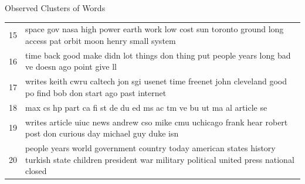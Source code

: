 \documentclass{article}
\begin{document}
\begin{question}
\begin{qsection}{Observed Clusters of Words}
\begin{tabular}[h!]{| c | L |}
			15	& 	space gov nasa high power earth work low cost sun toronto ground long access pat orbit moon henry small system \\
			16	& 	time back good make didn lot things don thing put people years long bad ve doesn ago point give ll \\
			17	& 	writes keith cwru caltech jon sgi usenet time freenet john cleveland good po find bob don start ago past internet \\
			18	& 	max cs hp part ca fi st de du ed ms ac tm ve bu ut ma al article se \\
			19	& 	writes article uiuc news andrew cso mike cmu uchicago frank hear robert post don curious day michael guy duke isn \\
			20	& 	people years world government country today american states history turkish state children president war military political united press national closed \\
			\hline
		\end{tabular}
	\end{qsection}

	
\end{question}

\clearpage
\end{document}
